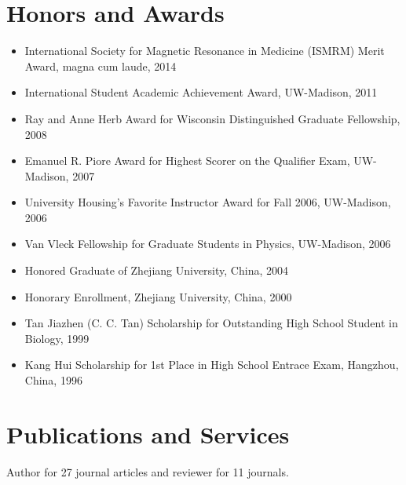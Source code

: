 \documentclass[centered,11pt,overlapped]{res}
\begin{document}
\begin{resume}
{\section{\sc Honors and Awards}
\begin{itemize}[leftmargin=-0.1in]
\item International Society for Magnetic Resonance in Medicine (ISMRM) Merit Award, magna cum laude, 2014
\item International Student Academic Achievement Award, UW-Madison, 2011
\item Ray and Anne Herb Award for Wisconsin Distinguished Graduate Fellowship, 2008
\item Emanuel R. Piore Award for Highest Scorer on the Qualifier Exam, UW-Madison, 2007
\item University Housing's Favorite Instructor Award for Fall 2006, UW-Madison, 2006
\item Van Vleck Fellowship for Graduate Students in Physics, UW-Madison, 2006
\item Honored Graduate of Zhejiang University, China, 2004
\item Honorary Enrollment, Zhejiang University, China, 2000
\item Tan Jiazhen (C. C. Tan) Scholarship for Outstanding High School Student in Biology, 1999
\item Kang Hui Scholarship for 1st Place in High School Entrace Exam, Hangzhou, China, 1996
\end{itemize}


\section{\sc Publications and Services}
Author for 27 journal articles and reviewer for 11 journals.
}


\end{resume}
\end{document}
